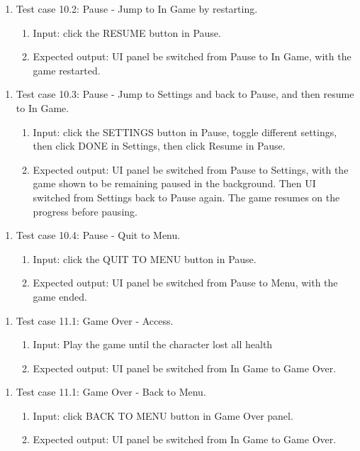 \documentclass[11pt]{article}
\begin{document}
    \begin{enumerate}
        \item Test case 10.2: Pause - Jump to In Game by restarting.
        \begin{enumerate}
            \item  Input: click the RESUME button in Pause.
            \item  Expected output: UI panel be switched from Pause to In Game, with the game restarted.
        \end{enumerate}
    \end{enumerate}
    \begin{enumerate}
        \item Test case 10.3: Pause - Jump to Settings and back to Pause, and then resume to In Game.
        \begin{enumerate}
            \item  Input: click the SETTINGS button in Pause, toggle different settings, then click DONE in Settings, then click Resume in Pause.
            \item  Expected output: UI panel be switched from Pause to Settings, with the game shown to be remaining paused in the background. Then UI switched from Settings back to Pause again. The game resumes on the progress before pausing.
        \end{enumerate}
    \end{enumerate}
    \begin{enumerate}
        \item Test case 10.4: Pause - Quit to Menu.
        \begin{enumerate}
            \item  Input: click the QUIT TO MENU button in Pause.
            \item  Expected output: UI panel be switched from Pause to Menu, with the game ended.
        \end{enumerate}
    \end{enumerate}
    \begin{enumerate}
        \item Test case 11.1: Game Over - Access.
        \begin{enumerate}
            \item  Input: Play the game until the character lost all health
            \item  Expected output: UI panel be switched from In Game to Game Over.
        \end{enumerate}
    \end{enumerate}
    \begin{enumerate}
        \item Test case 11.1: Game Over - Back to Menu.
        \begin{enumerate}
            \item  Input: click BACK TO MENU button in Game Over panel.
            \item  Expected output: UI panel be switched from In Game to Game Over.
        \end{enumerate}
    \end{enumerate}
    
\end{document}
